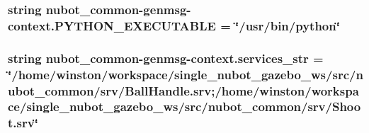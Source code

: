 \hypertarget{namespacenubot__common-genmsg-context_a07f30a33447f3b83a20605f1732e2763}{
\subsubsection[{P\-Y\-T\-H\-O\-N\-\_\-\-E\-X\-E\-C\-U\-T\-A\-B\-L\-E}]{\setlength{\rightskip}{0pt plus 5cm}string nubot\-\_\-common-\/genmsg-\/context.\-P\-Y\-T\-H\-O\-N\-\_\-\-E\-X\-E\-C\-U\-T\-A\-B\-L\-E = \char`\"{}/usr/bin/python\char`\"{}}}\label{namespacenubot__common-genmsg-context_a07f30a33447f3b83a20605f1732e2763}
\hypertarget{namespacenubot__common-genmsg-context_a1e2a824c1778c805a4593863a72ba35e}{
\subsubsection[{services\-\_\-str}]{\setlength{\rightskip}{0pt plus 5cm}string nubot\-\_\-common-\/genmsg-\/context.\-services\-\_\-str = \char`\"{}/home/winston/workspace/single\-\_\-nubot\-\_\-gazebo\-\_\-ws/src/nubot\-\_\-common/srv/Ball\-Handle.\-srv;/home/winston/workspace/single\-\_\-nubot\-\_\-gazebo\-\_\-ws/src/nubot\-\_\-common/srv/Shoot.\-srv\char`\"{}}}\label{namespacenubot__common-genmsg-context_a1e2a824c1778c805a4593863a72ba35e}
